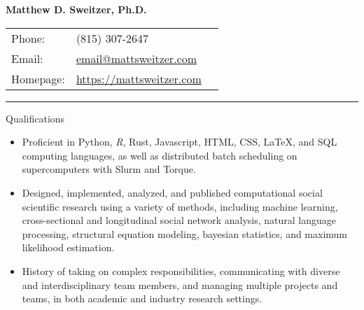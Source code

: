 \documentclass[letterpaper, 9pt]{extarticle}
\def\name{Matthew D. Sweitzer, Ph.D.}
\begin{document}
{\selectfont
\begin{center}
{\Large \bf \name}
\end{center}

\vspace{0pt}

\begin{tabularx}{\textwidth}{lXr}
Phone: & (815) 307-2647\\%
Email: & \href{mailto:email@mattsweitzer.com}{email@mattsweitzer.com}\\%
Homepage: & \href{https://mattsweitzer.com}{https://mattsweitzer.com}\\%
\end{tabularx}

\vspace{0pt}

\rule{\textwidth}{0.25pt}
\raggedright

\vspace{-4pt}
\begin{center}
\large{Qualifications}
\end{center}

\begin{itemize}[leftmargin=!,labelindent=-10pt,itemindent=0pt]
\item Proficient in Python, \textit{R}, Rust, Javascript, HTML, CSS, \LaTeX , and SQL computing languages, as well as distributed batch scheduling on supercomputers with Slurm and Torque.

\vspace{-4pt}
\item Designed, implemented, analyzed, and published computational social scientific research using a variety of methods, including machine learning, cross-sectional and longitudinal social network analysis, natural language processing, structural equation modeling, bayesian statistics, and maximum likelihood estimation.

\vspace{-4pt}
\item History of taking on complex responsibilities, communicating with diverse and interdisciplinary team members, and managing multiple projects and teams, in both academic and industry research settings.
\end{itemize}

\vspace{-7.5pt}

}
\end{document}
